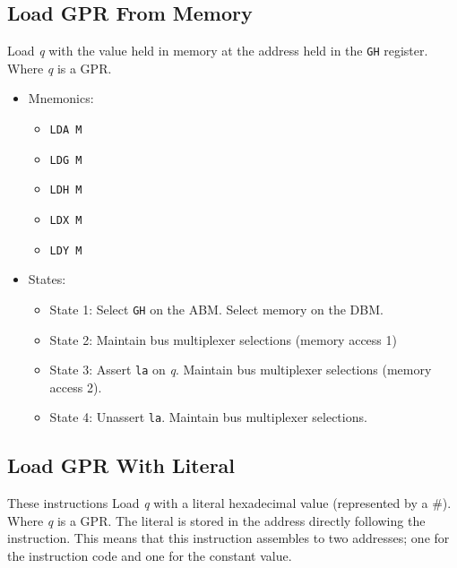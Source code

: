 \documentclass[a4paper,12pt]{article}
\newcommand{\Gr}{\texttt{G}}
\newcommand{\Hr}{\texttt{H}}
\newcommand{\qq}{\textit{q}}
\begin{document}
\subsection{Load GPR From Memory}
Load \qq{} with the value held in memory at the address held in the \Gr{}\Hr{}
register. Where \qq{} is a GPR.
\par

\begin{itemize}
\item Mnemonics:
\begin{itemize}
	\item \texttt{LDA M}
	\item \texttt{LDG M}
	\item \texttt{LDH M}
	\item \texttt{LDX M}
	\item \texttt{LDY M}
\end{itemize}
\item States:
\begin{itemize}
	\item State 1: Select \Gr{}\Hr{} on the ABM. Select memory on the DBM.
	\item State 2: Maintain bus multiplexer selections (memory access 1)
	\item State 3: Assert \texttt{la} on \qq{}. Maintain bus multiplexer
	selections (memory access 2).
	\item State 4: Unassert \texttt{la}. Maintain bus multiplexer 
	selections.
\end{itemize}
\end{itemize}

\subsection{Load GPR With Literal}
These instructions Load \qq{} with a literal hexadecimal value (represented by
a \#). Where \qq{} is a GPR. The literal is stored in the address directly 
following the instruction. This means that this instruction assembles to two
addresses; one for the instruction code and one for the constant value.
\par
\end{document}
